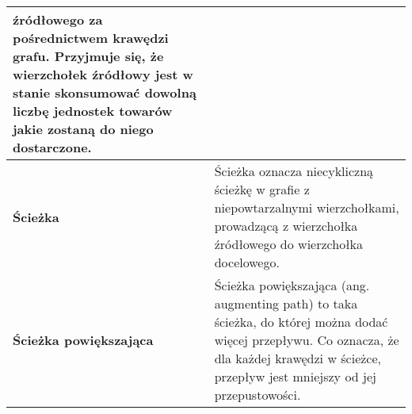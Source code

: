 \documentclass[10pt]{minutes}
\begin{document}
\begin{longtable}{>{\bfseries}p{} p{}}
    źródłowego za pośrednictwem krawędzi grafu. Przyjmuje się, że wierzchołek źródłowy jest w stanie skonsumować dowolną liczbę jednostek towarów jakie zostaną
    do niego dostarczone.\\
    \midrule
    Ścieżka &
    Ścieżka oznacza niecykliczną ścieżkę w grafie z niepowtarzalnymi wierzchołkami, prowadzącą z wierzchołka źródłowego do wierzchołka docelowego.\\
    \midrule
    Ścieżka powiększająca &
    Ścieżka powiększająca (ang. augmenting path) to taka ścieżka, do której można dodać więcej przepływu. Co oznacza, że dla każdej krawędzi w ścieżce, 
    przepływ jest mniejszy od jej przepustowości.\\
    \bottomrule
  \end{longtable}
\end{document}
